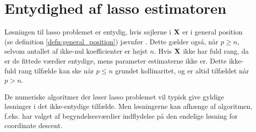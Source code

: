 \section{Entydighed af lasso estimatoren}
Løsningen til lasso problemet er entydig, hvis søjlerne i \(\mathbf{X}\) er i general position (se definition \ref{defn:general_position}) jævnfør \citep{lasso_unique}.
Dette gælder også, når \(p \geq n\), selvom antallet af ikke-nul koefficienter er højst \(n\).
Hvis \(\mathbf{X}\) ikke har fuld rang, da er de fittede værdier entydige, mens parameter estimaterne ikke er.
Dette ikke-fuld rang tilfælde kan ske når \(p \leq n\) grundet kollinaritet, og er altid tilfældet når \(p>n\).

De numeriske algoritmer der løser lasso problemet vil typisk give gyldige løsninger i det ikke-entydige tilfælde.
Men løsningerne kan afhænge af algoritmen, f.eks. har valget af begyndelsesværdier indflydelse på den endelige løsning for coordinate descent.

%


